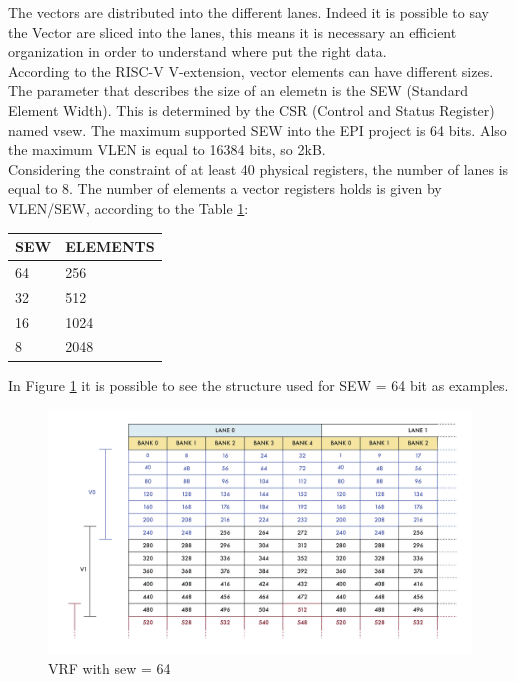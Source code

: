 The vectors are distributed into the different lanes. Indeed it is possible to say the Vector are sliced into the lanes, this means it is necessary an efficient organization in order to understand where put the right data.\\


According to the RISC-V V-extension, vector elements can have different sizes. The parameter that describes the size of an elemetn is the SEW (Standard Element Width). This is determined by the CSR (Control and Status Register) named vsew. The maximum supported SEW into the EPI project is 64 bits. Also the maximum VLEN is equal to 16384 bits, so 2kB.\\

Considering the constraint of at least 40 physical registers, the number of lanes is equal to 8.
The number of elements a vector registers holds is given by VLEN/SEW, according to the Table \ref{sew-el}:


\begin{table}[H]
    \centering
    \begin{tabular}{|l|l|}
    \hline
        \rowcolor[HTML]{C0C0C0} 
        SEW & ELEMENTS \\ \hline
        64  & 256      \\ \hline
        32  & 512      \\ \hline
        16  & 1024     \\ \hline
        8   & 2048     \\ \hline
    \end{tabular}
    \label{sew-el}
\end{table}

In Figure \ref{vrf-64} it is possible to see the structure used for SEW = 64 bit as examples.
\begin{figure}[H]
    \centering
    \includegraphics[scale = 0.45]{Chapter_1/img/vrf-64.png}
    \caption{VRF with sew = 64}
    \label{vrf-64}
\end{figure}

